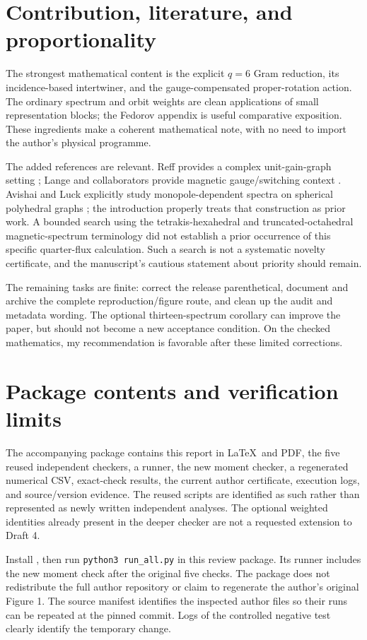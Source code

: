 \documentclass[11pt,a4paper]{article}
\begin{document}
\section{Contribution, literature, and proportionality}
The strongest mathematical content is the explicit $q=6$ Gram reduction, its incidence-based intertwiner, and the gauge-compensated proper-rotation action. The ordinary spectrum and orbit weights are clean applications of small representation blocks; the Fedorov appendix is useful comparative exposition. These ingredients make a coherent mathematical note, with no need to import the author's physical programme.

The added references are relevant. Reff provides a complex unit-gain-graph setting \cite{reff}; Lange and collaborators provide magnetic gauge/switching context \cite{lange}. Avishai and Luck explicitly study monopole-dependent spectra on spherical polyhedral graphs \cite{avishai}; the introduction properly treats that construction as prior work. A bounded search using the tetrakis-hexahedral and truncated-octahedral magnetic-spectrum terminology did not establish a prior occurrence of this specific quarter-flux calculation. Such a search is not a systematic novelty certificate, and the manuscript's cautious statement about priority should remain.

The remaining tasks are finite: correct the release parenthetical, document and archive the complete reproduction/figure route, and clean up the audit and metadata wording. The optional thirteen-spectrum corollary can improve the paper, but should not become a new acceptance condition. On the checked mathematics, my recommendation is favorable after these limited corrections.

\appendix
\small
\section{Package contents and verification limits}
The accompanying package contains this report in \LaTeX\ and PDF, the five reused independent checkers, a runner, the new moment checker, a regenerated numerical CSV, exact-check results, the current author certificate, execution logs, and source/version evidence. The reused scripts are identified as such rather than represented as newly written independent analyses. The optional weighted identities already present in the deeper checker are not a requested extension to Draft 4.

Install , then run \texttt{python3 run\_all.py} in this review package. Its runner includes the new moment check after the original five checks. The package does not redistribute the full author repository or claim to regenerate the author's original Figure 1. The source manifest identifies the inspected author files so their runs can be repeated at the pinned commit. Logs of the controlled negative test clearly identify the temporary change.
\end{document}
